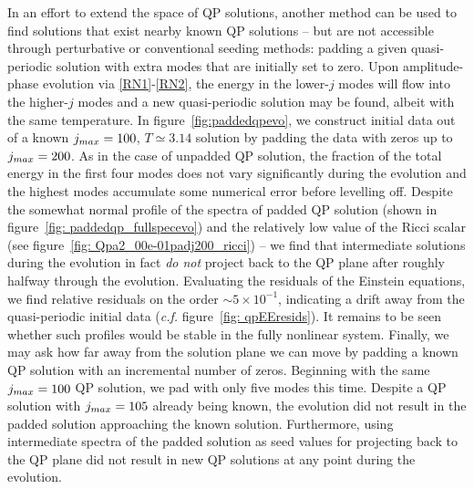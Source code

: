 \documentclass[../PhD.tex]{subfiles}
\begin{document}
In an effort to extend the space of QP solutions, another method can be used to find solutions that exist nearby known QP solutions -- but are not accessible through perturbative or conventional seeding methods: padding a given quasi-periodic solution with extra modes that are initially set to zero. Upon amplitude-phase evolution via \eqref{RN1}-\eqref{RN2}, the energy in the lower-$j$ modes will flow into the higher-$j$ modes and a new quasi-periodic solution may be found, albeit with the same temperature. In figure~\ref{fig:paddedqpevo}, we construct initial data out of a known $j_{max} = 100$, $T \simeq 3.14$ solution by padding the data with zeros up to $j_{max} = 200$. As in the case of unpadded QP solution, the fraction of the total energy in the first four modes does not vary significantly during the evolution and the highest modes accumulate some numerical error before levelling off. Despite the somewhat normal profile of the spectra of padded QP solution (shown in figure~\ref{fig: paddedqp_fullspecevo}) and the relatively low value of the Ricci scalar (see figure~\ref{fig: Qpa2_00e-01padj200_ricci}) --  we find that intermediate solutions during the evolution in fact \emph{do not} project back to the QP plane after roughly halfway through the evolution. Evaluating the residuals of the Einstein equations, we find relative residuals on the order ${\sim 5 \times 10^{-1}}$, indicating a drift away from the quasi-periodic initial data (\emph{c.f.} figure~\ref{fig: qpEEresids}). It remains to be seen whether such profiles would be stable in the fully nonlinear system. Finally, we may ask how far away from the solution plane we can move by padding a known QP solution with an incremental number of zeros. Beginning with the same $j_{max} = 100$ QP solution, we pad with only five modes this time. Despite a QP solution with $j_{max} = 105$ already being known, the evolution did not result in the padded solution approaching the known solution. Furthermore, using intermediate spectra of the padded solution as seed values for projecting back to the QP plane did not result in new QP solutions at any point during the evolution.
\end{document}
